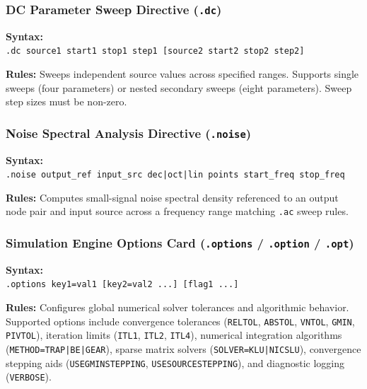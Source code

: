 \subsubsection{DC Parameter Sweep Directive (\texttt{.dc})}
\begin{compactitem}
    \item \textbf{Syntax:} \\
    \texttt{.dc source1 start1 stop1 step1 [source2 start2 stop2 step2]}
    \item \textbf{Rules:} Sweeps independent source values across specified ranges. Supports single sweeps (four parameters) or nested secondary sweeps (eight parameters). Sweep step sizes must be non-zero.
\end{compactitem}

\subsubsection{Noise Spectral Analysis Directive (\texttt{.noise})}
\begin{compactitem}
    \item \textbf{Syntax:} \\
    \texttt{.noise output\_ref input\_src dec|oct|lin points start\_freq stop\_freq}
    \item \textbf{Rules:} Computes small-signal noise spectral density referenced to an output node pair and input source across a frequency range matching \texttt{.ac} sweep rules.
\end{compactitem}

\subsubsection{Simulation Engine Options Card (\texttt{.options} / \texttt{.option} / \texttt{.opt})}
\begin{compactitem}
    \item \textbf{Syntax:} \\
    \texttt{.options key1=val1 [key2=val2 ...] [flag1 ...]}
    \item \textbf{Rules:} Configures global numerical solver tolerances and algorithmic behavior. Supported options include convergence tolerances (\texttt{RELTOL}, \texttt{ABSTOL}, \texttt{VNTOL}, \texttt{GMIN}, \texttt{PIVTOL}), iteration limits (\texttt{ITL1}, \texttt{ITL2}, \texttt{ITL4}), numerical integration algorithms (\texttt{METHOD=TRAP|BE|GEAR}), sparse matrix solvers (\texttt{SOLVER=KLU|NICSLU}), convergence stepping aids (\texttt{USEGMINSTEPPING}, \texttt{USESOURCESTEPPING}), and diagnostic logging (\texttt{VERBOSE}).
\end{compactitem}

